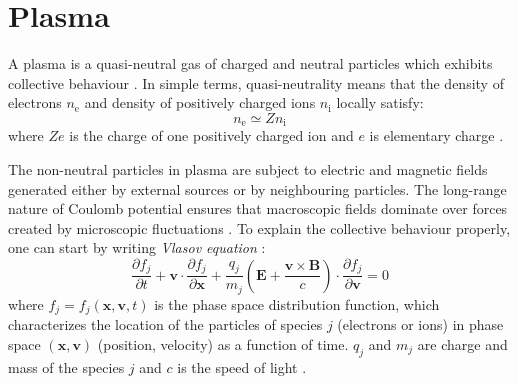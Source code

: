 \chapter{Plasma}
\label{ch:plasma-theory}
A plasma is a quasi-neutral gas of charged and neutral particles which exhibits collective behaviour \cite{plasma-intro3}. In simple terms, quasi-neutrality means that the density of electrons $n_\mathrm{e}$ and density of positively charged ions $n_\mathrm{i}$ locally satisfy:
\begin{equation}
	n_\mathrm{e} \simeq Zn_\mathrm{i}
\end{equation}
\noindent where $Ze$ is the charge of one positively charged ion and $e$ is elementary charge \cite{plasma-intro}. 

The non-neutral particles in plasma are subject to electric and magnetic fields generated either by external sources or by neighbouring particles. The long-range nature of Coulomb potential ensures that macroscopic fields dominate over forces created by microscopic fluctuations \cite{plasma-intro}. To explain the collective behaviour properly, one can start by writing \textit{Vlasov equation} \cite{laser-plasma4}:
\begin{equation}
	\frac{\partial f_j}{\partial t} + \bm{v} \cdot \frac{\partial f_j}{\partial \bm{x}} + \frac{q_j}{m_j}\left(\bm{E} + \frac{\bm{v}\times\bm{B}}{c}\right)\cdot \frac{\partial f_j}{\partial \bm{v}} = 0
\end{equation}
\noindent where $f_j = f_j\left(\bm{x},\bm{v},t\right)$ is the phase space distribution function, which characterizes the location of the particles of species $j$ (electrons or ions) in phase space $\left(\bm{x},\bm{v}\right)$ (position, velocity) as a function of time. $q_j$ and $m_j$ are charge and mass of the species $j$ and $c$ is the speed of light \cite{laser-plasma4}.

